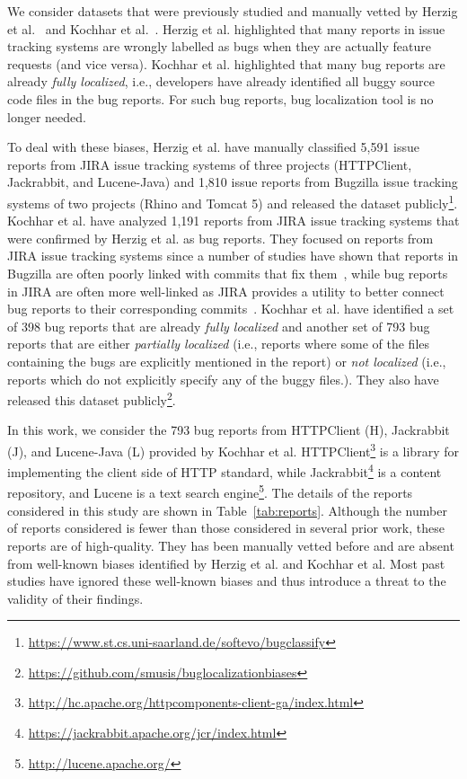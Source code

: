 We consider datasets that were previously studied and manually vetted by Herzig et al.~\cite{HerzigJZ13} and Kochhar et al.~\cite{KochharTL14}. Herzig et al. highlighted that many reports in issue tracking systems are wrongly labelled as bugs when they are actually feature requests (and vice versa). Kochhar et al. highlighted that many bug reports are already {\em fully localized}, i.e., developers have already identified all buggy source code files in the bug reports. For such bug reports, bug localization tool is no longer needed.

To deal with these biases, Herzig et al. have manually classified 5,591 issue reports from JIRA issue tracking systems of three projects (HTTPClient, Jackrabbit, and Lucene-Java) and 1,810 issue reports from Bugzilla issue tracking systems of two projects (Rhino and Tomcat 5) and released the dataset publicly\footnote{\url{https://www.st.cs.uni-saarland.de/softevo/bugclassify}}. Kochhar et al. have analyzed 1,191 reports from JIRA issue tracking systems that were confirmed by Herzig et al. as bug reports. They focused on reports from JIRA issue tracking systems since a number of studies have shown that reports in Bugzilla are often poorly linked with commits that fix them~\cite{BachmannBRDB10,BirdBADBFD09}, while bug reports in JIRA are often more well-linked as JIRA provides a utility to better connect bug reports to their corresponding commits~\cite{BissyandeTWLJR13}. Kochhar et al. have identified a set of 398 bug reports that are already {\em fully localized} and another set of 793 bug reports that are either {\em partially localized} (i.e., reports where some of the files containing the bugs are explicitly mentioned in the report) or {\em not localized} (i.e., reports which do not explicitly specify any of the buggy files.). They also have released this dataset publicly\footnote{\url{https://github.com/smusis/buglocalizationbiases}}.

In this work, we consider the 793 bug reports from HTTPClient (H), Jackrabbit (J), and Lucene-Java (L) provided by Kochhar et al. HTTPClient\footnote{\url{http://hc.apache.org/httpcomponents-client-ga/index.html}} is a library for implementing the client side of HTTP standard, while Jackrabbit\footnote{\url{https://jackrabbit.apache.org/jcr/index.html}} is a content repository, and Lucene is a text search engine\footnote{\url{ http://lucene.apache.org/}}. The details of the reports considered in this study are shown in Table~\ref{tab:reports}. Although the number of reports considered is fewer than those considered in several prior work, these reports are of high-quality. They has been manually vetted before and are absent from well-known biases identified by Herzig et al. and Kochhar et al. Most past studies have ignored these well-known biases and thus introduce a threat to the validity of their findings.

